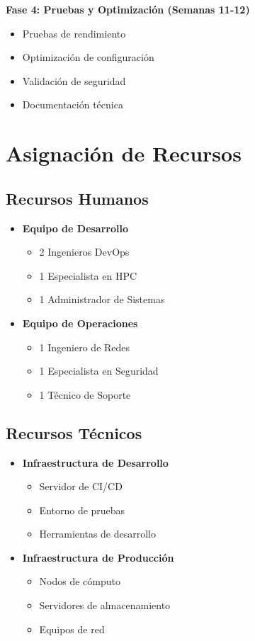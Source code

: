 \begin{infocaja}
\textbf{Fase 4: Pruebas y Optimización (Semanas 11-12)}
\begin{itemize}
    \item Pruebas de rendimiento
    \item Optimización de configuración
    \item Validación de seguridad
    \item Documentación técnica
\end{itemize}
\end{infocaja}

\section{Asignación de Recursos}
\subsection{Recursos Humanos}
\begin{itemize}
    \item \textbf{Equipo de Desarrollo}
    \begin{itemize}
        \item 2 Ingenieros DevOps
        \item 1 Especialista en HPC
        \item 1 Administrador de Sistemas
    \end{itemize}
    \item \textbf{Equipo de Operaciones}
    \begin{itemize}
        \item 1 Ingeniero de Redes
        \item 1 Especialista en Seguridad
        \item 1 Técnico de Soporte
    \end{itemize}
\end{itemize}

\subsection{Recursos Técnicos}
\begin{itemize}
    \item \textbf{Infraestructura de Desarrollo}
    \begin{itemize}
        \item Servidor de CI/CD
        \item Entorno de pruebas
        \item Herramientas de desarrollo
    \end{itemize}
    \item \textbf{Infraestructura de Producción}
    \begin{itemize}
        \item Nodos de cómputo
        \item Servidores de almacenamiento
        \item Equipos de red
    \end{itemize}
\end{itemize}

